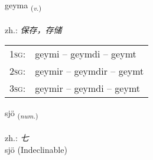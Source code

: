 \documentclass[frontgrid, backgrid]{flacards}\usepackage[]{graphicx}\usepackage[]{xcolor}
\begin{document}
\renewcommand{\flhead}{\vskip5pt \fboxsep=0pt {\small\bfseries\footnotesize Sagnorð | 动词}}
\renewcommand{\fcfoot}{\vskip5pt \fboxsep=0pt \hspace{2pt}{\small\bfseries\footnotesize 1K}}

\renewcommand{\blhead}{\vskip5pt {\small\bfseries\footnotesize Sagnorð | 动词 }}
\renewcommand{\bcfoot}{\vskip5pt \hspace{2pt}{\small\bfseries\footnotesize 1K}}


{geyma \small{\textsubscript{(\textit{v.})}} \\[1ex] %
\textphonetic{[ceiːma]} \\
zh.: \emph{保存，存储} \\  [2ex]
\renewcommand*{\arraystretch}{0.8}
\begin{tabular}{p{1cm}l}
\textsc{1sg}: & geymi -- geymdi -- geymt \\ 
\textsc{2sg}: & geymir -- geymdir -- geymt \\ 
\textsc{3sg}: & geymir -- geymdi -- geymt \\ 
\end{tabular}
}


\renewcommand{\flhead}{\vskip5pt \fboxsep=0pt {\small\bfseries\footnotesize Töluorð | 数量词}}
\renewcommand{\fcfoot}{\vskip5pt \fboxsep=0pt \hspace{2pt}{\small\bfseries\footnotesize 1K}}

\renewcommand{\blhead}{\vskip5pt {\small\bfseries\footnotesize Töluorð | 数量词 }}
\renewcommand{\bcfoot}{\vskip5pt \hspace{2pt}{\small\bfseries\footnotesize 1K}}


{sjö \small{\textsubscript{(\textit{num.})}} \\[1ex]
\textphonetic{[sjœː]} \\
zh.: \emph{七} \\  [2ex]
sjö (Indeclinable)}

\renewcommand{\flhead}{\vskip5pt \fboxsep=0pt {\small\bfseries\footnotesize Nafnorð | 名词}}
\renewcommand{\fcfoot}{\vskip5pt \fboxsep=0pt \hspace{2pt}{\small\bfseries\footnotesize 1K}}
\end{document}
